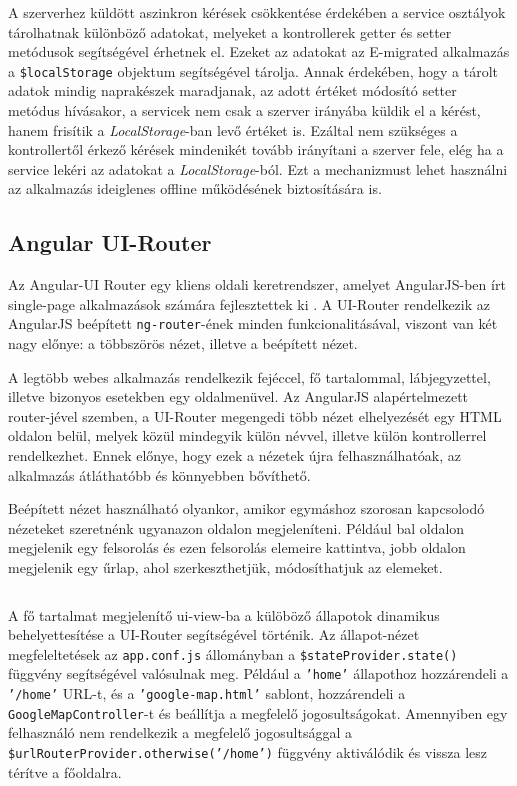 A szerverhez küldött aszinkron kérések csökkentése érdekében a service osztályok tárolhatnak különböző adatokat, melyeket a kontrollerek getter és setter metódusok segítségével érhetnek el. Ezeket az adatokat az E-migrated alkalmazás a \texttt{\$localStorage} objektum segítségével tárolja. Annak érdekében, hogy a tárolt adatok mindig naprakészek maradjanak, az adott értéket módosító setter metódus hívásakor, a servicek nem csak a szerver irányába küldik el a kérést, hanem frisítik a \textit{LocalStorage}-ban levő értéket is. Ezáltal nem szükséges a kontrollertől érkező kérések mindenikét tovább irányítani a szerver fele, elég ha a service lekéri az adatokat a  \textit{LocalStorage}-ból. Ezt a mechanizmust lehet használni az alkalmazás ideiglenes offline működésének biztosítására is. 
\begin{reviewed}
\section{Angular UI-Router}
\label{UI-Router}

Az Angular-UI Router egy kliens oldali keretrendszer, amelyet AngularJS-ben írt single-page alkalmazások számára fejlesztettek ki \cite{uirouter}. A UI-Router rendelkezik az AngularJS beépített \texttt{ng-router}-ének minden funkcionalitásával, viszont van két nagy előnye: a többszörös nézet, illetve a beépített nézet. 

A legtöbb webes alkalmazás rendelkezik  fejéccel, fő tartalommal, lábjegyzettel, illetve bizonyos esetekben egy oldalmenüvel. Az AngularJS alapértelmezett router-jével szemben, a UI-Router megengedi több nézet elhelyezését egy HTML oldalon belül, melyek közül mindegyik külön névvel, illetve külön kontrollerrel rendelkezhet. Ennek előnye, hogy ezek a nézetek újra felhasználhatóak, az alkalmazás átláthatóbb és könnyebben bővíthető. 

Beépített nézet használható olyankor, amikor egymáshoz szorosan kapcsolodó nézeteket szeretnénk ugyanazon oldalon megjeleníteni. Például bal oldalon megjelenik egy felsorolás és ezen felsorolás elemeire kattintva, jobb oldalon megjelenik egy űrlap, ahol szerkeszthetjük, módosíthatjuk az elemeket.

\begin{listing}
  \inputminted[fontsize=\small]{js}{progfiles/app.conf.js}
  \caption{A fő tartalmat megjelenítő ui-view-ba a külöböző állapotok dinamikus behelyettesítése a UI-Router segítségével történik. Az állapot-nézet megfeleltetések az \texttt{app.conf.js} állományban a \texttt{\$stateProvider.state()} függvény segítségével valósulnak meg.  Például a \texttt{'home'} állapothoz hozzárendeli a \texttt{'/home'} URL-t, és a \texttt{'google-map.html'} sablont, hozzárendeli a \texttt{GoogleMapController}-t és beállítja a megfelelő jogosultságokat. Amennyiben egy felhasználó nem rendelkezik a megfelelő jogosultsággal a \texttt{\$urlRouterProvider.otherwise('/home')} függvény aktiválódik és vissza lesz térítve a főoldalra. }
  \label{lst:appconf}
\end{listing}




\end{reviewed}
